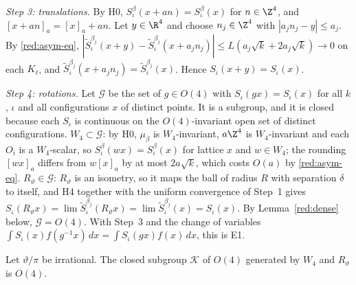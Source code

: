 \emph{Step 3: translations.} By H0, $S^\beta_\iota(x+an)=S^\beta_\iota(x)$ for $n\in\Z^4$, and $[x+an]_a=[x]_a+an$. Let $y\in\R^4$ and choose $n_j\in\Z^4$ with $|a_jn_j-y|\le a_j$. By \eqref{red:asym-eq}, $|\tilde S^{\beta_j}_\iota(x+y)-\tilde S^{\beta_j}_\iota(x+a_jn_j)|\le L(a_j\sqrt k+2a_j\sqrt k)\to0$ on each $K_\ell$, and $\tilde S^{\beta_j}_\iota(x+a_jn_j)=\tilde S^{\beta_j}_\iota(x)$. Hence $S_\iota(x+y)=S_\iota(x)$.

\emph{Step 4: rotations.} Let $\mathcal G$ be the set of $g\in O(4)$ with $S_\iota(gx)=S_\iota(x)$ for all $k$, $\iota$ and all configurations $x$ of distinct points. It is a subgroup, and it is closed because each $S_\iota$ is continuous on the $O(4)$-invariant open set of distinct configurations. $W_4\subset\mathcal G$: by H0, $\mu_\beta$ is $W_4$-invariant, $a\Z^4$ is $W_4$-invariant and each $O_i$ is a $W_4$-scalar, so $S^\beta_\iota(wx)=S^\beta_\iota(x)$ for lattice $x$ and $w\in W_4$; the rounding $[wx]_a$ differs from $w[x]_a$ by at most $2a\sqrt k$, which costs $O(a)$ by \eqref{red:asym-eq}. $R_\vartheta\in\mathcal G$: $R_\vartheta$ is an isometry, so it maps the ball of radius $R$ with separation $\delta$ to itself, and H4 together with the uniform convergence of Step~1 gives $S_\iota(R_\vartheta x)=\lim\tilde S^{\beta_j}_\iota(R_\vartheta x)=\lim\tilde S^{\beta_j}_\iota(x)=S_\iota(x)$. By Lemma~\ref{red:dense} below, $\mathcal G=O(4)$. With Step~3 and the change of variables $\int S_\iota(x)f(g^{-1}x)\,dx=\int S_\iota(gx)f(x)\,dx$, this is E1.

\begin{lemma}\label{red:dense}
Let $\vartheta/\pi$ be irrational. The closed subgroup $\mathcal K$ of $O(4)$ generated by $W_4$ and $R_\vartheta$ is $O(4)$.
\end{lemma}

